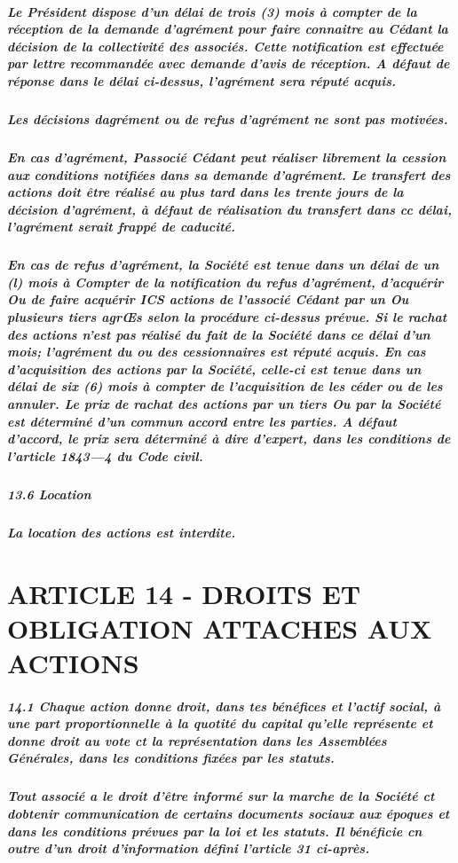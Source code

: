 \documentclass[a4paper, 11pt]{article}
\begin{document}
\subparagraph{
  Le Président dispose d'un délai de trois (3) mois à compter de la réception de la demande d'agrément pour faire connaitre au Cédant la décision de la collectivité des associés. Cette notification est effectuée par lettre recommandée avec demande d'avis de réception. A défaut de réponse dans le délai ci-dessus, l'agrément sera réputé acquis.
}

\subparagraph{
  Les décisions dagrément ou de refus d'agrément ne sont pas motivées.
}

\subparagraph{
  En cas d'agrément, Passocié Cédant peut réaliser librement la cession aux conditions notifiées dans sa demande d'agrément. Le transfert des actions doit être réalisé au plus tard dans les trente jours de la décision d'agrément, à défaut de réalisation du transfert dans cc délai, l'agrément serait frappé de caducité.
}

\subparagraph{
  En cas de refus d'agrément, la Société est tenue dans un délai de un (l) mois à Compter de la notification du refus d'agrément, d'acquérir Ou de faire acquérir ICS actions de l'associé Cédant par un Ou plusieurs tiers agrŒs selon la procédure ci-dessus prévue.
  Si le rachat des actions n'est pas réalisé du fait de la Société dans ce délai d'un mois; l'agrément du ou des cessionnaires est réputé acquis.
  En cas d'acquisition des actions par la Société, celle-ci est tenue dans un délai de six (6) mois à compter de l'acquisition de les céder ou de les annuler.
  Le prix de rachat des actions par un tiers Ou par la Société est déterminé d'un commun accord entre les parties. A défaut d'accord, le prix sera déterminé à dire d'expert, dans les conditions de l'article 1843—4 du Code civil.
}

\subparagraph{
  13.6 Location
}

\subparagraph{
  La location des actions est interdite.
}

\section*{ARTICLE 14 - DROITS ET OBLIGATION ATTACHES AUX ACTIONS}


\subparagraph{
  14.1 Chaque action donne droit, dans tes bénéfices et l'actif social, à une part proportionnelle à la quotité du capital qu'elle représente et donne droit au vote ct la représentation dans les Assemblées Générales, dans les conditions fixées par les statuts.
}

\subparagraph{
  Tout associé a le droit d'être informé sur la marche de la Société ct dobtenir communication de certains documents sociaux aux époques et dans les conditions prévues par la loi et les statuts. Il bénéficie cn outre d'un droit d'information défini l'article 31 ci-après.
}
\end{document}
